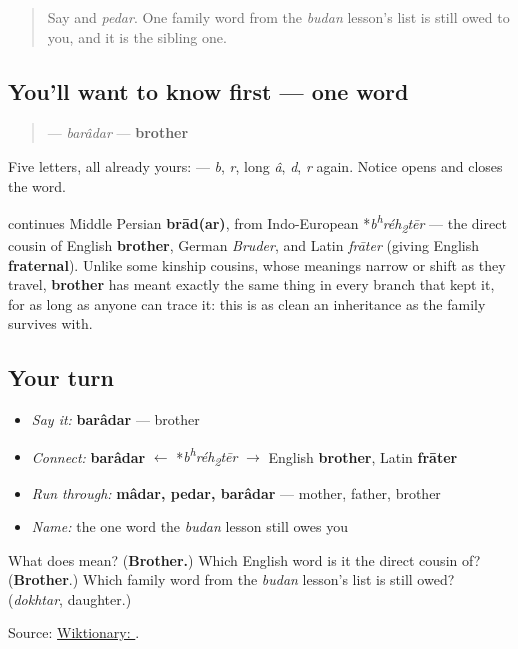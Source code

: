 \label{lesson:FA-C10-baradar}



\begin{quote}
Say \textbf{} and \emph{pedar}. One family word from the \emph{budan} lesson's list is still owed to you, and it is the sibling one.
\end{quote}

\subsection*{You'll want to know first — one word}
\begin{quote}
\textbf{} — \emph{barâdar} — \textbf{brother}
\end{quote}

Five letters, all already yours: \textbf{    } — \emph{b}, \emph{r}, long \emph{â}, \emph{d}, \emph{r} again. Notice \textbf{} opens and closes the word.

\begin{cousinweb}
\textbf{} continues Middle Persian \textbf{brād(ar)}, from Indo-European *\emph{b\textsuperscript{h}réh\textsubscript{2}tēr} — the direct cousin of English \textbf{brother}, German \emph{Bruder}, and Latin \emph{frāter} (giving English \textbf{fraternal}). Unlike some kinship cousins, whose meanings narrow or shift as they travel, \textbf{brother} has meant exactly the same thing in every branch that kept it, for as long as anyone can trace it: this is as clean an inheritance as the family survives with.
\end{cousinweb}

\subsection*{Your turn}
\begin{itemize}
\raggedright
  \item \emph{Say it:} \textbf{barâdar} — brother
  \item \emph{Connect:} \textbf{barâdar} $\leftarrow$ *\emph{b\textsuperscript{h}réh\textsubscript{2}tēr} $\to$ English \textbf{brother}, Latin \textbf{frāter}
  \item \emph{Run through:} \textbf{mâdar, pedar, barâdar} — mother, father, brother
  \item \emph{Name:} the one word the \emph{budan} lesson still owes you
\end{itemize}

\begin{tcolorbox}[breakable,colback=teal!4,colframe=teal!35!black,title={Before you move on}]
What does \textbf{} mean? (\textbf{Brother.}) Which English word is it the direct cousin of? (\textbf{Brother}.) Which family word from the \emph{budan} lesson's list is still owed? (\emph{dokhtar}, daughter.)

Source: \href{https://en.wiktionary.org/wiki/\%D8\%A8\%D8\%B1\%D8\%A7\%D8\%AF\%D8\%B1}{Wiktionary: }.
\end{tcolorbox}
